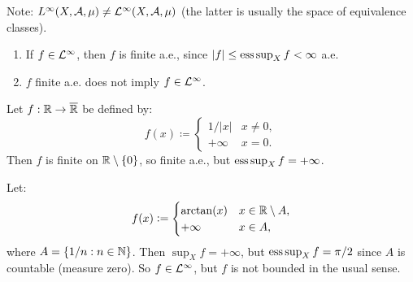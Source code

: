 \begin{remark}
Note: $L^\infty(X,\mathcal{A},\mu) \neq \mathcal{L}^\infty(X,\mathcal{A},\mu)$ (the latter is usually the space of equivalence classes).
\end{remark}

\begin{remark}
\begin{enumerate}
    \item If $f \in \mathcal{L}^\infty$, then $f$ is finite a.e., since $|f| \leq \operatorname*{ess\,sup}_X f < \infty$ a.e.
    \item $f$ finite a.e. does not imply $f \in \mathcal{L}^\infty$.
\end{enumerate}
\end{remark}

\begin{example}
Let $f:\mathbb{R} \to \overline{\mathbb{R}}$ be defined by:
\[
f(x) \coloneqq 
\begin{cases}
1/|x| & x \neq 0, \\
+\infty & x = 0.
\end{cases}
\]
Then $f$ is finite on $\mathbb{R} \setminus \{0\}$, so finite a.e., but $\operatorname*{ess\,sup}_X f = +\infty$.
\end{example}

\begin{example}
Let:
\[
f(x) \mathrel{\mathop:}= 
\begin{cases}
\arctan(x) & x \in \mathbb{R} \setminus A, \\
+\infty & x \in A,
\end{cases}
\]
where $A = \{1/n : n \in \mathbb{N}\}$.
Then $\sup_X f = +\infty$, but $\operatorname*{ess\,sup}_X f = \pi/2$ since $A$ is countable (measure zero).
So $f \in \mathcal{L}^\infty$, but $f$ is not bounded in the usual sense.
\end{example}
